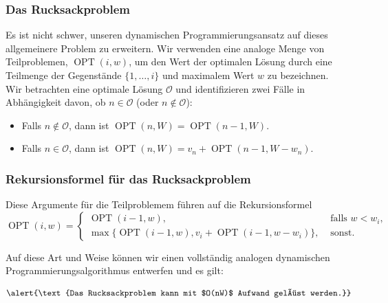 \documentclass[smaller]{beamer}
\renewcommand{\O}{\mathcal{O}}
\DeclareMathOperator{\opt}{OPT}
\begin{document}
\begin{frame}
 \frametitle{Das Rucksackproblem}
 Es ist nicht schwer, unseren dynamischen Programmierungsansatz auf dieses allgemeinere Problem zu erweitern. Wir verwenden eine analoge Menge von Teilproblemen, $\opt{(i, w)}$, \alert{um den Wert der optimalen Lösung durch eine Teilmenge der Gegenstände $\{1, \ldots, i \}$ und maximalem Wert $w$ zu bezeichnen.} \\ \medskip
 Wir betrachten eine optimale Lösung $\O$ und identifizieren zwei Fälle in Abhängigkeit davon, ob $n \in \O$ (oder $n \notin \O$):
\begin{itemize}
\item Falls $n \notin \O$, dann ist $\opt{(n,W)} = \opt{(n-1,W)}$.
\item Falls $n \in \O$, dann ist $\opt{(n,W)} = v_n + \opt{(n-1, W-w_n)}$.
\end{itemize}
\end{frame}

\begin{frame}
 \frametitle{Rekursionsformel für das Rucksackproblem}
 Diese Argumente für die Teilproblemem führen auf die Rekursionsformel
\begin{equation*}
\opt{(i,w)} = \begin{cases}
\opt{(i-1,w)}, & \text{ falls } w < w_i, \\
\max\{\opt{(i-1,w)}, v_i + \opt{(i-1,w-w_i)} \}, & \text{ sonst.}
\end{cases}
\end{equation*}

Auf diese Art und Weise können wir einen vollständig analogen dynamischen Programmierungsalgorithmus entwerfen und es gilt:

\begin{equation*}
\alert{\text{Das Rucksackproblem kann mit $O(nW)$ Aufwand gelöst werden.}}
\end{equation*}
\end{frame}
\end{document}
